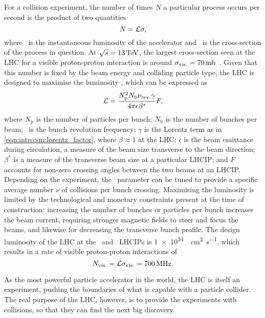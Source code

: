 For a collision experiment, the number of times $N$ a particular process occurs 
per second is the product of two quantities
\begin{equation}
  N = \mathcal{L}\sigma,
  \label{eqn:intro:lhc:lumi_xsec}
\end{equation}
where \lumi\ is the instantaneous luminosity of the accelerator and \xsec\ is 
the cross-section of the process in question.
At $\sqrts = \SI{13}{\TeV}$, the largest cross-section seen at the \ac{LHC} for 
a visible proton-proton interaction is around $\xsecppvis = 
\SI{70}{\milli\barn}$~\cite{Aaboud:2016mmw,CMS:2016ael}.
Given that this number is fixed by the beam energy and colliding particle type, 
the \ac{LHC} is designed to maximise the luminosity \lumi, which can be 
expressed as
\begin{equation}
  \mathcal{L} = \frac{N_{\text{p}}^{2}N_{\text{b}}\nu_{\textnormal{rev.}}\gamma}{4\pi\epsilon\beta^{*}}F,
  \label{eqn:intro:lhc:inst_lumi}
\end{equation}
where $N_{\text{p}}$ is the number of particles per bunch; $N_{\text{b}}$ is 
the number of bunches per beam; \revfreq\ is the bunch revolution frequency; $\gamma$ 
is the Lorentz term as in \cref{eqn:intro:sm:lorentz_factor}, where $\beta 
\approx 1$ at the \ac{LHC}; $\epsilon$ is the beam emittance during 
circulation, a measure of the beam size transverse to the beam direction; 
$\beta^{*}$ is a measure of the transverse beam size at a particular 
\ac{LHCIP}; and $F$ accounts for non-zero crossing angles between the two beams 
at an \ac{LHCIP}.
Depending on the experiment, the \betastar\ parameter can be tuned to provide a 
specific average number $\nu$ of collisions per bunch crossing.
Maximising the luminosity is limited by the technological and monetary 
constraints present at the time of construction: increasing the number of 
bunches or particles per bunch increases the beam current, requiring stronger 
magnetic fields to steer and focus the beams, and likewise for decreasing the 
transverse bunch profile.
The design luminosity of the \ac{LHC} at the \atlas\ and \cms\ \acp{LHCIP} is
\SI{1e34}{\per\square\centi\metre\per\second}, which results in a rate of 
visible proton-proton interactions of
\begin{equation}
  N_{\text{vis.}} = \mathcal{L}\sigma_{\textnormal{vis.}}
                  = \SI{700}{\mega\hertz}.
  \label{eqn:intro:lhc:nppvis}
\end{equation}

As the most powerful particle accelerator in the world, the \ac{LHC} is itself 
an experiment, pushing the boundaries of what is capable with a particle 
collider.
The real purpose of the \ac{LHC}, however, is to provide the experiments with 
collisions, so that they can find the next big discovery.

